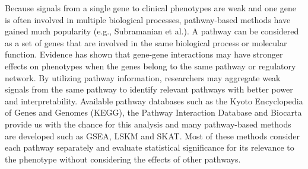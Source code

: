 \documentclass[a4paper,12pt]{article}
\begin{document}
	Because signals from a single gene to clinical phenotypes are weak and one gene is often involved in multiple biological processes, pathway-based methods have gained much popularity (e.g., Subramanian et al.).\cite{subramanian2005gene} A pathway can be considered as a set of genes that are involved in the same biological process or molecular function. Evidence has shown that gene-gene interactions may have stronger effects on phenotypes when the genes belong to the same pathway or regulatory network.\cite{carlson2004mapping} By utilizing pathway information, researchers may aggregate weak signals from the same pathway to identify relevant pathways with better power and interpretability. Available pathway databases such as the Kyoto Encyclopedia of Genes and Genomes (KEGG), \cite{kanehisa2000kegg} the Pathway Interaction Database \cite{schaefer2008pid} and Biocarta\cite{nishimura2001biocarta} provide us with the chance for this analysis and many pathway-based methods are developed such as GSEA,\cite{subramanian2005gene} LSKM \cite{liu2007semiparametric} and SKAT. \cite{wu2011rare} Most of these methods consider each pathway separately and evaluate statistical significance for its relevance to the phenotype without considering the effects of other pathways.
	
\end{document}
